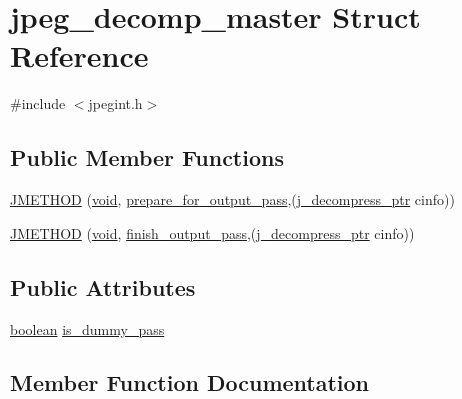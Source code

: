 \hypertarget{structjpeg__decomp__master}{}\section{jpeg\+\_\+decomp\+\_\+master Struct Reference}
\label{structjpeg__decomp__master}


{\ttfamily \#include $<$jpegint.\+h$>$}

\subsection*{Public Member Functions}
\begin{DoxyCompactItemize}
\item 
\hyperlink{structjpeg__decomp__master_ab0e51667ba436fad82e7cf95b1bd4120}{J\+M\+E\+T\+H\+O\+D} (\hyperlink{png_8h_aa8c59027f9ab2769342f248709d68d17}{void}, \hyperlink{jdmaster_8c_a67420f4157afdc9fdf730941dbaf8503}{prepare\+\_\+for\+\_\+output\+\_\+pass},(\hyperlink{jpeglib_8h_a00c7d78af44bd26a901c791ccfc1e178}{j\+\_\+decompress\+\_\+ptr} cinfo))
\item 
\hyperlink{structjpeg__decomp__master_a7dec615b828e443ddddf99078d1edb9a}{J\+M\+E\+T\+H\+O\+D} (\hyperlink{png_8h_aa8c59027f9ab2769342f248709d68d17}{void}, \hyperlink{jdmaster_8c_a38d4530fe1a7a3442c983735c656dfd0}{finish\+\_\+output\+\_\+pass},(\hyperlink{jpeglib_8h_a00c7d78af44bd26a901c791ccfc1e178}{j\+\_\+decompress\+\_\+ptr} cinfo))
\end{DoxyCompactItemize}
\subsection*{Public Attributes}
\begin{DoxyCompactItemize}
\item 
\hyperlink{jmorecfg_8h_a7c6368b321bd9acd0149b030bb8275ed}{boolean} \hyperlink{structjpeg__decomp__master_a93cbde036bd87ab00b0ac8214e27bbe1}{is\+\_\+dummy\+\_\+pass}
\end{DoxyCompactItemize}


\subsection{Member Function Documentation}
\hypertarget{structjpeg__decomp__master_ab0e51667ba436fad82e7cf95b1bd4120}{}
